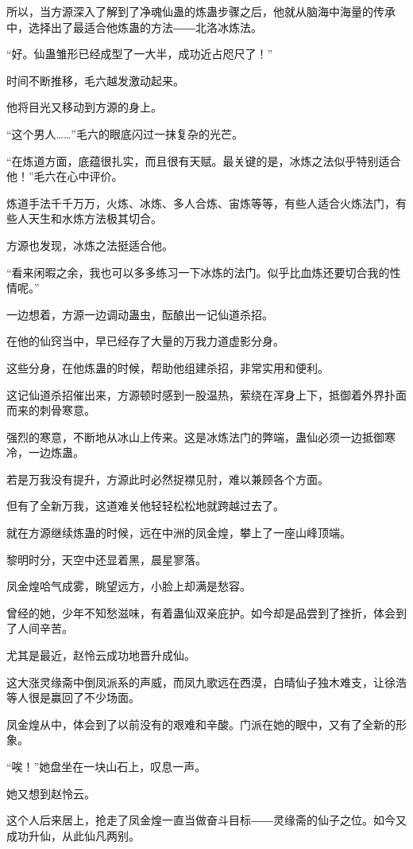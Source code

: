 \begin{this_body}
所以，当方源深入了解到了净魂仙蛊的炼蛊步骤之后，他就从脑海中海量的传承中，选择出了最适合他炼蛊的方法――北洛冰炼法。

“好。仙蛊雏形已经成型了一大半，成功近占咫尺了！”

时间不断推移，毛六越发激动起来。

他将目光又移动到方源的身上。

“这个男人……”毛六的眼底闪过一抹复杂的光芒。

“在炼道方面，底蕴很扎实，而且很有天赋。最关键的是，冰炼之法似乎特别适合他！”毛六在心中评价。

炼道手法千千万万，火炼、冰炼、多人合炼、宙炼等等，有些人适合火炼法门，有些人天生和水炼方法极其切合。

方源也发现，冰炼之法挺适合他。

“看来闲暇之余，我也可以多多练习一下冰炼的法门。似乎比血炼还要切合我的性情呢。”

一边想着，方源一边调动蛊虫，酝酿出一记仙道杀招。

在他的仙窍当中，早已经存了大量的万我力道虚影分身。

这些分身，在他炼蛊的时候，帮助他组建杀招，非常实用和便利。

这记仙道杀招催出来，方源顿时感到一股温热，萦绕在浑身上下，抵御着外界扑面而来的刺骨寒意。

强烈的寒意，不断地从冰山上传来。这是冰炼法门的弊端，蛊仙必须一边抵御寒冷，一边炼蛊。

若是万我没有提升，方源此时必然捉襟见肘，难以兼顾各个方面。

但有了全新万我，这道难关他轻轻松松地就跨越过去了。

就在方源继续炼蛊的时候，远在中洲的凤金煌，攀上了一座山峰顶端。

黎明时分，天空中还显着黑，晨星寥落。

凤金煌哈气成雾，眺望远方，小脸上却满是愁容。

曾经的她，少年不知愁滋味，有着蛊仙双亲庇护。如今却是品尝到了挫折，体会到了人间辛苦。

尤其是最近，赵怜云成功地晋升成仙。

这大涨灵缘斋中倒凤派系的声威，而凤九歌远在西漠，白晴仙子独木难支，让徐浩等人很是赢回了不少场面。

凤金煌从中，体会到了以前没有的艰难和辛酸。门派在她的眼中，又有了全新的形象。

“唉！”她盘坐在一块山石上，叹息一声。

她又想到赵怜云。

这个人后来居上，抢走了凤金煌一直当做奋斗目标――灵缘斋的仙子之位。如今又成功升仙，从此仙凡两别。


\end{this_body}
